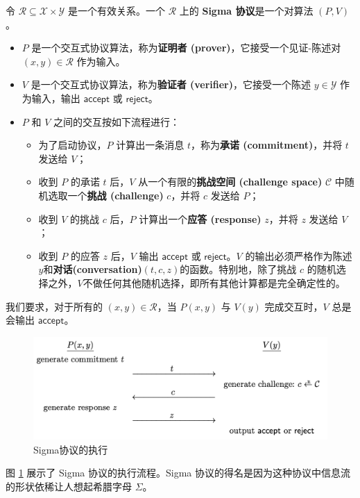 \begin{definition}[Sigma 协议]
令 $\mathcal{R}\subseteq\mathcal{X}×\mathcal{Y}$ 是一个有效关系。一个 $\mathcal{R}$ 上的 \textbf{Sigma 协议}是一个对算法 $(P,V)$。
\begin{itemize}
	\item $P$ 是一个交互式协议算法，称为\textbf{证明者 (prover)}，它接受一个见证-陈述对 $(x,y)\in\mathcal{R}$ 作为输入。
	\item $V$ 是一个交互式协议算法，称为\textbf{验证者 (verifier)}，它接受一个陈述 $y\in\mathcal{Y}$ 作为输入，输出 $\mathsf{accept}$ 或 $\mathsf{reject}$。
	\item $P$ 和 $V$ 之间的交互按如下流程进行：
		\begin{itemize}
			\item 为了启动协议，$P$ 计算出一条消息 $t$，称为\textbf{承诺 (commitment)}，并将 $t$ 发送给 $V$；
			\item 收到 $P$ 的承诺 $t$ 后，$V$ 从一个有限的\textbf{挑战空间 (challenge space)} $\mathcal{C}$ 中随机选取一个\textbf{挑战 (challenge)} $c$，并将 $c$ 发送给 $P$；
			\item 收到 $V$ 的挑战 $c$ 后，$P$ 计算出一个\textbf{应答 (response)} $z$，并将 $z$ 发送给 $V$；
			\item 收到 $P$ 的应答 $z$ 后，$V$ 输出 $\mathsf{accept}$ 或 $\mathsf{reject}$。$V$ 的输出必须严格作为陈述$y$和\textbf{对话(conversation)}$(t,c,z)$的函数。特别地，除了挑战 $c$ 的随机选择之外，$V$不做任何其他随机选择，即所有其他计算都是完全确定性的。
		\end{itemize}
\end{itemize}
我们要求，对于所有的 $(x,y)\in\mathcal{R}$，当 $P(x,y)$ 与 $V(y)$ 完成交互时，$V$ 总是会输出 $\mathsf{accept}$。
\end{definition}

\begin{figure}[hbt]
  \centering
  \includegraphics[width=0.75\linewidth]{figures/chapter19/fig5.png}
  \caption{Sigma协议的执行}
  \label{fig:19-5}
\end{figure}

图 \ref{fig:19-5} 展示了 Sigma 协议的执行流程。Sigma 协议的得名是因为这种协议中信息流的形状依稀让人想起希腊字母 $\Sigma$。


